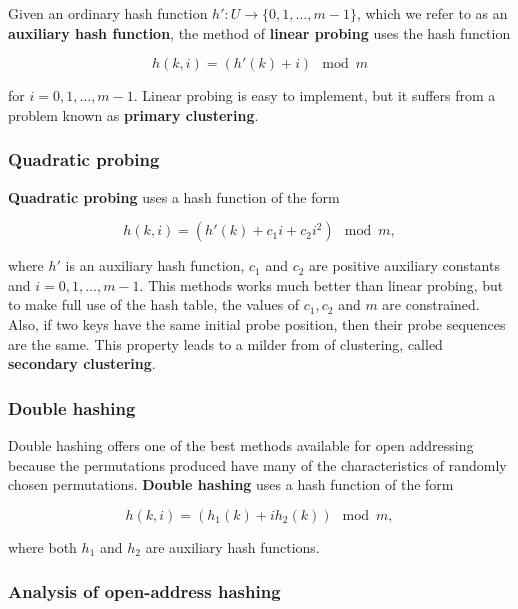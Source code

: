 \documentclass[12pt]{article}
\begin{document}
Given an ordinary hash function $h': U \rightarrow \{ 0,1,\dots,m-1 \}$, which we refer to as an \textbf {auxiliary hash function}, the method of \textbf {linear probing} uses the hash function

\begin{equation*}
  h(k,i) = (h'(k) + i) \mod m
\end{equation*}

for $i = 0,1,\dots,m-1$. Linear probing is easy to implement, but it suffers from a problem known as \textbf {primary clustering}.

\subsubsection*{Quadratic probing}

\textbf {Quadratic probing} uses a hash function of the form

\begin{equation*}
  h(k,i) = (h'(k) + c_1 i + c_2 i^2) \mod m,
\end{equation*}

where $h'$ is an auxiliary hash function, $c_1$ and $c_2$ are positive auxiliary constants and $i = 0,1,\dots,m-1$. This methods works much better than linear probing, but to make full use of the hash table, the values of $c_1, c_2$ and $m$ are constrained. Also, if two keys have the same initial probe position, then their probe sequences are the same. This property leads to a milder from of clustering, called \textbf {secondary clustering}.

\subsubsection*{Double hashing}

Double hashing offers one of the best methods available for open addressing because the permutations produced have many of the characteristics of randomly chosen permutations. \textbf {Double hashing} uses a hash function of the form

\begin{equation*}
  h(k,i) = (h_1(k) + ih_2(k)) \mod m,
\end{equation*}

where both $h_1$ and $h_2$ are auxiliary hash functions.

\subsubsection*{Analysis of open-address hashing}
\end{document}
